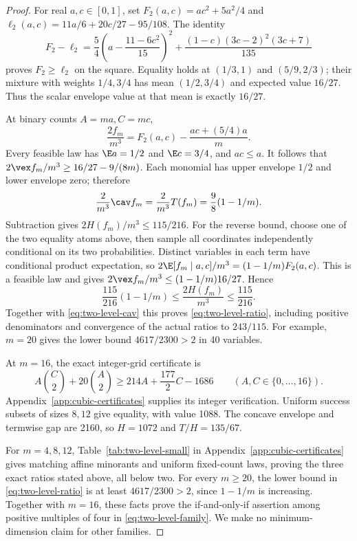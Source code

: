 \begin{proof}
For real $a,c\in[0,1]$, set $F_2(a,c)=ac^2+5a^2/4$ and
$\ell_2(a,c)=11a/6+20c/27-95/108$. The identity
\begin{equation}\label{eq:two-level-scalar}
 F_2-\ell_2=\frac54\left(a-\frac{11-6c^2}{15}\right)^2
       +\frac{(1-c)(3c-2)^2(3c+7)}{135}
\end{equation}
proves $F_2\ge\ell_2$ on the square. Equality holds at $(1/3,1)$ and
$(5/9,2/3)$; their mixture with weights $1/4,3/4$ has mean
$(1/2,3/4)$ and expected value $16/27$. Thus the scalar envelope value
at that mean is exactly $16/27$.

At binary counts $A=ma,C=mc$,
\[
 \frac{2f_m}{m^3}=F_2(a,c)-\frac{ac+(5/4)a}{m}.
\]
Every feasible law has $\E a=1/2$ and $\E c=3/4$, and $ac\le a$.
It follows that $2\vex f_m/m^3\ge16/27-9/(8m)$. Each monomial
has upper envelope $1/2$ and lower envelope zero; therefore
\begin{equation}\label{eq:two-level-cav}
 \frac{2}{m^3}\cav f_m=\frac{2}{m^3}T(f_m)=\frac98(1-1/m).
\end{equation}
Subtraction gives $2H(f_m)/m^3\le115/216$.
For the reverse bound, choose one of the two equality atoms above, then
sample all coordinates independently conditional on its two probabilities.
Distinct variables in each term have conditional product expectation,
so $2\E[f_m\mid a,c]/m^3=(1-1/m)F_2(a,c)$. This is a feasible law and
gives $2\vex f_m/m^3\le(1-1/m)16/27$. Hence
\[
 \frac{115}{216}(1-1/m)\le\frac{2H(f_m)}{m^3}\le\frac{115}{216}.
\]
Together with \eqref{eq:two-level-cav} this proves
\eqref{eq:two-level-ratio}, including positive denominators and convergence
of the actual ratios to $243/115$. For example, $m=20$ gives the lower
bound $4617/2300>2$ in 40 variables.

At $m=16$, the exact integer-grid certificate is
\begin{equation}\label{eq:two-level-16-dual}
 A\binom C2+20\binom A2\ge214A+\frac{177}{2}C-1686
 \qquad(A,C\in\{0,\ldots,16\}).
\end{equation}
Appendix~\ref{app:cubic-certificates} supplies its integer verification.
Uniform success subsets of sizes $8,12$ give equality, with value 1088.
The concave envelope and termwise gap are 2160, so $H=1072$ and
$T/H=135/67$.

For $m=4,8,12$, Table~\ref{tab:two-level-small} in
Appendix~\ref{app:cubic-certificates} gives matching affine minorants and
uniform fixed-count laws, proving the three exact ratios stated above, all
below two. For every $m\ge20$, the lower bound in
\eqref{eq:two-level-ratio} is at least $4617/2300>2$, since
$1-1/m$ is increasing. Together with $m=16$, these facts prove the
if-and-only-if assertion among positive multiples of
four in \eqref{eq:two-level-family}. We make no minimum-dimension claim for
other families.


\end{proof}
